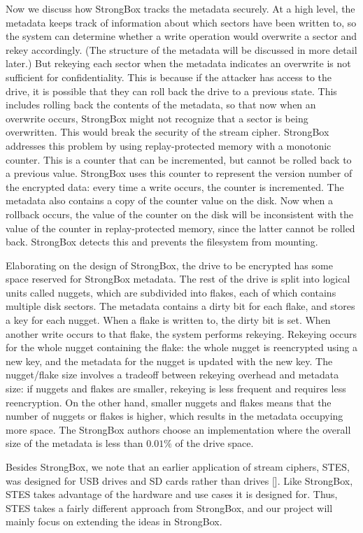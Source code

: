 \documentclass[11pt]{article}
\begin{document}
Now we discuss how StrongBox tracks the metadata securely.  At a high level, the metadata keeps track of information about which sectors have been written to, so the system can determine whether a write operation would overwrite a sector and rekey accordingly. (The structure of the metadata will be discussed in more detail later.) But rekeying each sector when the metadata indicates an overwrite is not sufficient for confidentiality.  This is because if the attacker has access to the drive, it is possible that they can roll back the drive to a previous state.  This includes rolling back the contents of the metadata, so that now when an overwrite occurs, StrongBox might not recognize that a sector is being overwritten.  This would break the security of the stream cipher.  StrongBox addresses this problem by using replay-protected memory with a monotonic counter.  This is a counter that can be incremented, but cannot be rolled back to a previous value.  StrongBox uses this counter to represent the version number of the encrypted data: every time a write occurs, the counter is incremented.  The metadata also contains a copy of the counter value on the disk.  Now when a rollback occurs, the value of the counter on the disk will be inconsistent with the value of the counter in replay-protected memory, since the latter cannot be rolled back.  StrongBox detects this and prevents the filesystem from mounting.

Elaborating on the design of StrongBox, the drive to be encrypted has some space reserved for StrongBox metadata.  The rest of the drive is split into logical units called nuggets, which are subdivided into flakes, each of which contains multiple disk sectors.  The metadata contains a dirty bit for each flake, and stores a key for each nugget.  When a flake is written to, the dirty bit is set.  When another write occurs to that flake, the system performs rekeying.  Rekeying occurs for the whole nugget containing the flake: the whole nugget is reencrypted using a new key, and the metadata for the nugget is updated with the new key.  The nugget/flake size involves a tradeoff between rekeying overhead and metadata size: if nuggets and flakes are smaller, rekeying is less frequent and requires less reencryption.  On the other hand, smaller nuggets and flakes means that the number of nuggets or flakes is higher, which results in the metadata occupying more space.  The StrongBox authors choose an implementation where the overall size of the metadata is less than $0.01\%$ of the drive space.

Besides StrongBox, we note that an earlier application of stream ciphers, STES, was designed for USB drives and SD cards rather than drives [].  Like StrongBox, STES takes advantage of the hardware and use cases it is designed for.  Thus, STES takes a fairly different approach from StrongBox, and our project will mainly focus on extending the ideas in StrongBox.
\end{document}
